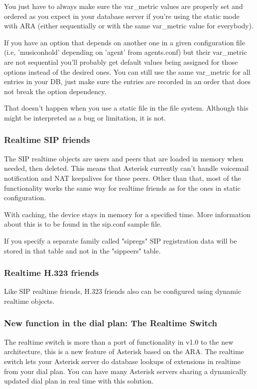 You just have to always make sure the var\_metric values are properly set and
ordered as you expect in your database server if you're using the static mode
with ARA (either sequentially or with the same var\_metric value for everybody).

If you have an option that depends on another one in a given configuration
file (i.e, 'musiconhold' depending on 'agent' from agents.conf) but their
var\_metric are not sequential you'll probably get default values being assigned for
those options instead of the desired ones. You can still use the same
var\_metric for all entries in your DB, just make sure the entries
are recorded in an order that does not break the option dependency.

That doesn't happen when you use a static file in the file system. Although
this might be interpreted as a bug or limitation, it is not.

\subsubsection{Realtime SIP friends}

The SIP realtime objects are users and peers that are loaded in memory
when needed, then deleted. This means that Asterisk currently can't handle
voicemail notification and NAT keepalives for these peers. Other than that,
most of the functionality works the same way for realtime friends as for
the ones in static configuration.

With caching, the device stays in memory for a specified time. More
information about this is to be found in the sip.conf sample file.

If you specify a separate family called "sipregs" SIP registration
data will be stored in that table and not in the "sippeers" table.

\subsubsection{Realtime H.323 friends}

Like SIP realtime friends, H.323 friends also can be configured using
dynamic realtime objects.

\subsubsection{New function in the dial plan: The Realtime Switch}

The realtime switch is more than a port of functionality in v1.0 to the
new architecture, this is a new feature of Asterisk based on the
ARA. The realtime switch lets your Asterisk server do database lookups
of extensions in realtime from your dial plan. You can have many Asterisk
servers sharing a dynamically updated dial plan in real time with this
solution.

